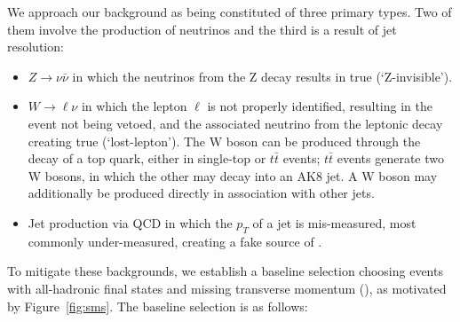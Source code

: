 We approach our background as being constituted of three primary types. Two of them involve the production of neutrinos and the third is a result of jet resolution:

\begin{itemize}
\item $Z\rightarrow\nu\bar{\nu}$ in which the neutrinos from the Z decay results in true \ptmiss (`Z-invisible').
\item $W\rightarrow\ell\nu$ in which the lepton $\ell$ is not properly identified, resulting in the event not being vetoed, and the associated neutrino from the leptonic decay creating true \ptmiss (`lost-lepton'). The W boson can be produced through the decay of a top quark, either in single-top or $t\bar{t}$ events; $t\bar{t}$ events generate two W bosons, in which the other may decay into an AK8 jet. A W boson may additionally be produced directly in association with other jets.
\item Jet production via QCD in which the $p_{T}$ of a jet is mis-measured, most commonly under-measured, creating a fake source of \ptmiss.
\end{itemize}

To mitigate these backgrounds, we establish a baseline selection choosing events with all-hadronic final states and missing transverse momentum (\ptmiss), as motivated by Figure~\ref{fig:sms}. The baseline selection is as follows:

